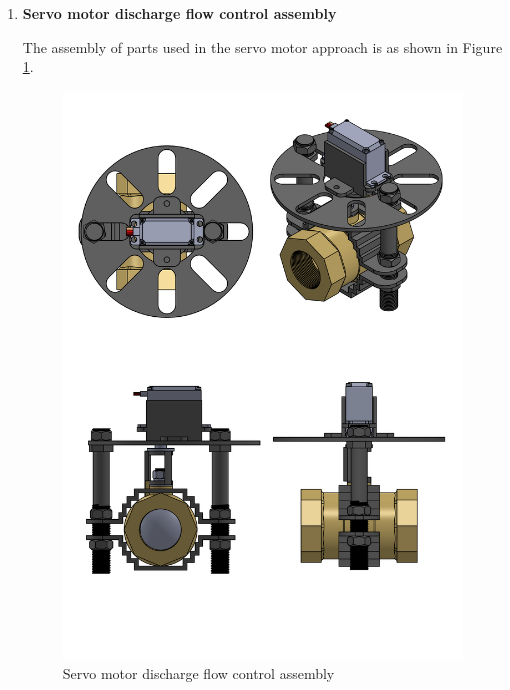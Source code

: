 \begin{enumerate}
\begin{enumerate}
    \par
    \item \textbf{Servo motor discharge flow control assembly}
    \par
    The assembly of parts used in the servo motor approach is as shown in Figure \ref{fig:servo_motor_discharge flow control assembly}.
     \begin{figure}[H]
         \centering
         \includegraphics[height=.75\textheight]{Figures/ServoHolderBallValveAssembly.PNG}
         \caption{Servo motor discharge flow control assembly}
         \label{fig:servo_motor_discharge flow control assembly}
     \end{figure}
      

\end{enumerate}
\end{enumerate}
